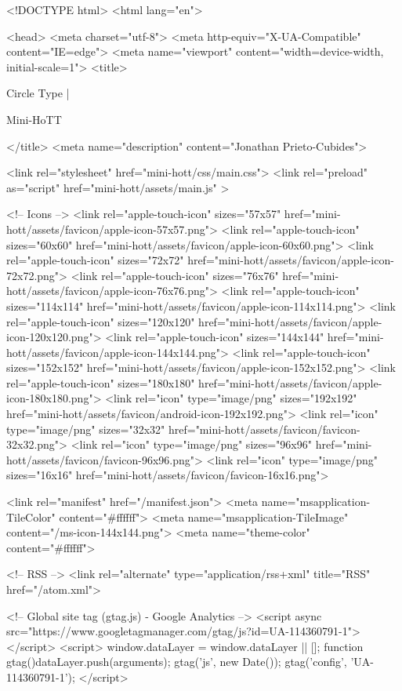 <!DOCTYPE html>
<html lang="en">

<head>
  <meta charset="utf-8">
  <meta http-equiv="X-UA-Compatible" content="IE=edge">
  <meta name="viewport" content="width=device-width, initial-scale=1">
  <title>
    
      
        Circle Type |
      
        Mini-HoTT
    
  </title>
  <meta name="description" content="Jonathan Prieto-Cubides">

  <link rel="stylesheet" href="mini-hott/css/main.css">
  <link rel="preload" as="script" href="mini-hott/assets/main.js" >

  <!-- Icons -->
  <link rel="apple-touch-icon" sizes="57x57" href="mini-hott/assets/favicon/apple-icon-57x57.png">
  <link rel="apple-touch-icon" sizes="60x60" href="mini-hott/assets/favicon/apple-icon-60x60.png">
  <link rel="apple-touch-icon" sizes="72x72" href="mini-hott/assets/favicon/apple-icon-72x72.png">
  <link rel="apple-touch-icon" sizes="76x76" href="mini-hott/assets/favicon/apple-icon-76x76.png">
  <link rel="apple-touch-icon" sizes="114x114" href="mini-hott/assets/favicon/apple-icon-114x114.png">
  <link rel="apple-touch-icon" sizes="120x120" href="mini-hott/assets/favicon/apple-icon-120x120.png">
  <link rel="apple-touch-icon" sizes="144x144" href="mini-hott/assets/favicon/apple-icon-144x144.png">
  <link rel="apple-touch-icon" sizes="152x152" href="mini-hott/assets/favicon/apple-icon-152x152.png">
  <link rel="apple-touch-icon" sizes="180x180" href="mini-hott/assets/favicon/apple-icon-180x180.png">
  <link rel="icon" type="image/png" sizes="192x192"  href="mini-hott/assets/favicon/android-icon-192x192.png">
  <link rel="icon" type="image/png" sizes="32x32" href="mini-hott/assets/favicon/favicon-32x32.png">
  <link rel="icon" type="image/png" sizes="96x96" href="mini-hott/assets/favicon/favicon-96x96.png">
  <link rel="icon" type="image/png" sizes="16x16" href="mini-hott/assets/favicon/favicon-16x16.png">

  <link rel="manifest" href="/manifest.json">
  <meta name="msapplication-TileColor" content="#ffffff">
  <meta name="msapplication-TileImage" content="/ms-icon-144x144.png">
  <meta name="theme-color" content="#ffffff">

  <!-- RSS -->
  <link rel="alternate" type="application/rss+xml" title="RSS" href="/atom.xml">

  <!-- Global site tag (gtag.js) - Google Analytics -->
  <script async src="https://www.googletagmanager.com/gtag/js?id=UA-114360791-1"></script>
  <script>
    window.dataLayer = window.dataLayer || [];
    function gtag(){dataLayer.push(arguments);}
    gtag('js', new Date());
    gtag('config', 'UA-114360791-1');
  </script>

